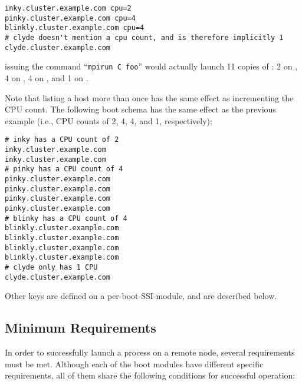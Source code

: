 \lstset{style=lam-shell}
\begin{lstlisting}
inky.cluster.example.com cpu=2
pinky.cluster.example.com cpu=4
blinkly.cluster.example.com cpu=4
# clyde doesn't mention a cpu count, and is therefore implicitly 1
clyde.cluster.example.com
\end{lstlisting}

\noindent issuing the command ``{\tt mpirun C foo}'' would actually
launch 11 copies of : 2 on , 4 on , 4
on , and 1 on .

Note that listing a host more than once has the same effect as
incrementing the CPU count.  The following boot schema has the same
effect as the previous example (i.e., CPU counts of 2, 4, 4, and 1,
respectively):

\lstset{style=lam-shell}
\begin{lstlisting}
# inky has a CPU count of 2
inky.cluster.example.com
inky.cluster.example.com
# pinky has a CPU count of 4
pinky.cluster.example.com
pinky.cluster.example.com
pinky.cluster.example.com
pinky.cluster.example.com
# blinky has a CPU count of 4
blinkly.cluster.example.com 
blinkly.cluster.example.com 
blinkly.cluster.example.com 
blinkly.cluster.example.com 
# clyde only has 1 CPU
clyde.cluster.example.com
\end{lstlisting}

Other keys are defined on a per-boot-SSI-module, and are described
below.


\subsection{Minimum Requirements}
\label{sec:lam-ssi-boot-min-reqs}

In order to successfully launch a process on a remote node, several
requirements must be met.  Although each of the boot modules have
different specific requirements, all of them share the following
conditions for successful operation:

